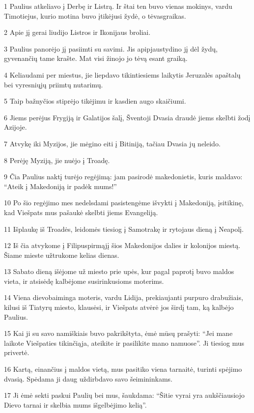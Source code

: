 \par 1 Paulius atkeliavo į Derbę ir Listrą. Ir štai ten buvo vienas mokinys, vardu Timotiejus, kurio motina buvo įtikėjusi žydė, o tėvas­graikas. 
\par 2 Apie jį gerai liudijo Listros ir Ikonijaus broliai. 
\par 3 Paulius panorėjo jį pasiimti su savimi. Jis apipjaustydino jį dėl žydų, gyvenančių tame krašte. Mat visi žinojo jo tėvą esant graiką. 
\par 4 Keliaudami per miestus, jie liepdavo tikintiesiems laikytis Jeruzalės apaštalų bei vyresniųjų priimtų nutarimų. 
\par 5 Taip bažnyčios stiprėjo tikėjimu ir kasdien augo skaičiumi. 
\par 6 Jiems perėjus Frygiją ir Galatijos šalį, Šventoji Dvasia draudė jiems skelbti žodį Azijoje. 
\par 7 Atvykę iki Myzijos, jie mėgino eiti į Bitiniją, tačiau Dvasia jų neleido. 
\par 8 Perėję Myziją, jie nuėjo į Troadę. 
\par 9 Čia Paulius naktį turėjo regėjimą: jam pasirodė makedonietis, kuris maldavo: “Ateik į Makedoniją ir padėk mums!” 
\par 10 Po šio regėjimo mes nedelsdami pasistengėme išvykti į Makedoniją, įsitikinę, kad Viešpats mus pašaukė skelbti jiems Evangeliją. 
\par 11 Išplaukę iš Troadės, leidomės tiesiog į Samotrakę ir rytojaus dieną į Neapolį. 
\par 12 Iš čia atvykome į Filipus­pirmąjį šios Makedonijos dalies ir kolonijos miestą. Šiame mieste užtrukome kelias dienas. 
\par 13 Sabato dieną išėjome už miesto prie upės, kur pagal paprotį buvo maldos vieta, ir atsisėdę kalbėjome susirinkusioms moterims. 
\par 14 Viena dievobaiminga moteris, vardu Lidija, prekiaujanti purpuro drabužiais, kilusi iš Tiatyrų miesto, klausėsi, ir Viešpats atvėrė jos širdį tam, ką kalbėjo Paulius. 
\par 15 Kai ji su savo namiškiais buvo pakrikštyta, ėmė mūsų prašyti: “Jei mane laikote Viešpaties tikinčiąja, ateikite ir pasilikite mano namuose”. Ji tiesiog mus privertė. 
\par 16 Kartą, einančius į maldos vietą, mus pasitiko viena tarnaitė, turinti spėjimo dvasią. Spėdama ji daug uždirbdavo savo šeimininkams. 
\par 17 Ji ėmė sekti paskui Paulių bei mus, šaukdama: “Šitie vyrai yra aukščiausiojo Dievo tarnai ir skelbia mums išgelbėjimo kelią”. 
